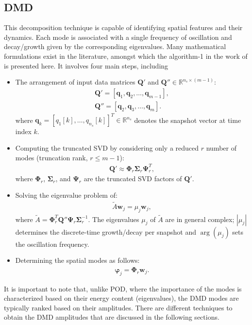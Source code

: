 \documentclass[a4paper,fleqn]{cas-sc}
\begin{document}
	\subsection{DMD}
	\label{DMD}
	
	This decomposition technique is capable of identifying spatial features and their dynamics. Each mode is associated with a single frequency of oscillation and decay/growth given by the corresponding eigenvalues. Many mathematical formulations exist in the literature, amongst which the algorithm-1 in the work of \citet{H.Tu2014} is presented here. It involves four main steps, including
	\begin{itemize}
		\item[1.] The arrangement of input data matrices $\mathbf{Q}'$ and $\mathbf{Q}''\in \mathbb{R}^{n_{s}\times (m-1)}$:
		\begin{subequations}\label{eq 6}
			\begin{align}
				\mathbf{Q}' = [\mathbf{q}_1,\mathbf{q}_2,\ldots,\mathbf{q}_{m-1}], \label{eq 6a} \\
				\mathbf{Q}'' = [\mathbf{q}_2,\mathbf{q}_3,\ldots,\mathbf{q}_{m}].\label{eq 6b}
			\end{align}
		\end{subequations}
		where $\mathbf{q}_k=[q_1[k],\ldots,q_{n_s}[k]]^T\in\mathbb{R}^{n_s}$ denotes the snapshot vector at time index $k$.
		\item[2.] Computing the truncated SVD by considering only a reduced $r$ number of modes (truncation rank, $r\le m-1$):
		\begin{align}
			\mathbf{Q}' \approx \mathbf{\Phi}_r\mathbf{\Sigma} _r \mathbf{\Psi}_r^T, \label{eq 7}
		\end{align}
		where $\mathbf{\Phi}_r$, $\mathbf{\Sigma}_r$, and $\mathbf{\Psi}_r$ are the truncated SVD factors of $\mathbf{Q}'$.
		\item[3.] Solving the eigenvalue problem of:
		\begin{align}
			\tilde{A} \mathbf{w}_j = \mu_j \mathbf{w}_j, \label{eq 8}
		\end{align}
		where $\tilde{A}=\mathbf{\Phi}_r^T \mathbf{Q}'' \mathbf{\Psi}_r \mathbf{\Sigma}_r^{-1}$. The eigenvalues $\mu_j$ of $\tilde{A}$ are in general complex; $|\mu_j|$ determines the discrete-time growth/decay per snapshot and $\arg(\mu_j)$ sets the oscillation frequency.
		
		\item[4.] Determining the spatial modes as follows:
		\begin{align}
			\boldsymbol{\varphi} _j = \mathbf{\Phi}_r\mathbf{w}_j. \label{eq 9}
		\end{align}
		
	\end{itemize}
	It is important to note that, unlike POD, where the importance of the modes is characterized based on their energy content (eigenvalues), the DMD modes are typically ranked based on their amplitudes. There are different techniques to obtain the DMD amplitudes that are discussed in the following sections.
	
\end{document}
